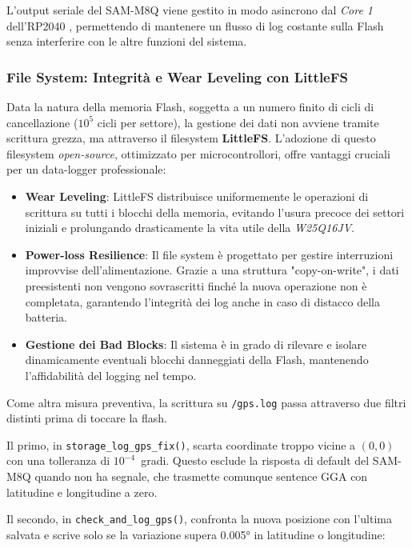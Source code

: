 L'output seriale del SAM-M8Q viene gestito in modo asincrono dal \textit{Core 1} dell'RP2040 \cite{rp2040_ds}, permettendo di mantenere un flusso di log costante sulla Flash senza interferire con le altre funzioni del sistema.

\subsubsection*{File System: Integrità e Wear Leveling con LittleFS}

Data la natura della memoria Flash, soggetta a un numero finito di cicli di cancellazione ($10^5$ cicli per settore), la gestione dei dati non avviene tramite scrittura grezza, ma attraverso il filesystem \textbf{LittleFS}. L'adozione di questo filesystem \textit{open-source}, ottimizzato per microcontrollori, offre vantaggi cruciali per un data-logger professionale:

\begin{itemize}

    \item \textbf{Wear Leveling}: LittleFS distribuisce uniformemente le operazioni di scrittura su tutti i blocchi della memoria, evitando l'usura precoce dei settori iniziali e prolungando drasticamente la vita utile della \textit{W25Q16JV}.
    \item \textbf{Power-loss Resilience}: Il file system è progettato per gestire interruzioni improvvise dell'alimentazione. Grazie a una struttura "copy-on-write", i dati preesistenti non vengono sovrascritti finché la nuova operazione non è completata, garantendo l'integrità dei log anche in caso di distacco della batteria.
    \item \textbf{Gestione dei Bad Blocks}: Il sistema è in grado di rilevare e isolare dinamicamente eventuali blocchi danneggiati della Flash, mantenendo l'affidabilità del logging nel tempo.
\end{itemize}

Come altra misura preventiva, la scrittura su \texttt{/gps.log} passa attraverso due filtri distinti prima
di toccare la flash.

Il primo, in \texttt{storage\_log\_gps\_fix()}, scarta coordinate troppo
vicine a $(0,0)$ con una tolleranza di $10^{-4}$~gradi. Questo esclude
la risposta di default del SAM-M8Q quando non ha segnale, che trasmette
comunque sentence GGA con latitudine e longitudine a zero.

Il secondo, in \texttt{check\_and\_log\_gps()}, confronta la nuova posizione
con l'ultima salvata e scrive solo se la variazione supera 0.005° in latitudine
o longitudine:

